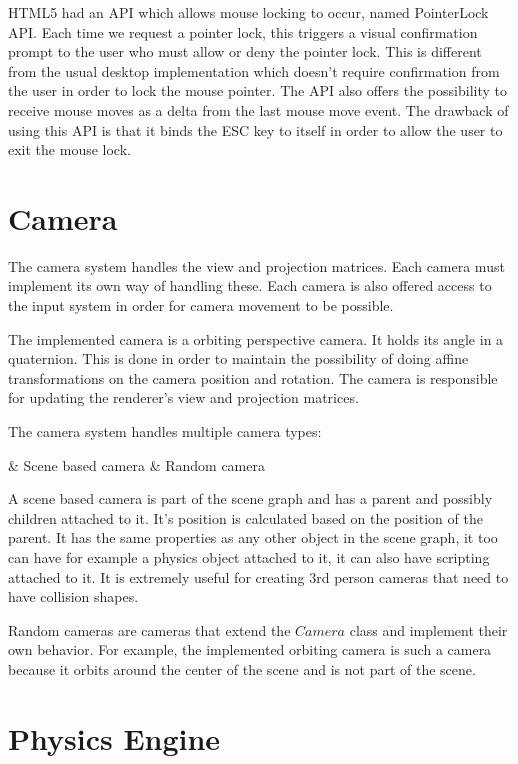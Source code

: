 HTML5 had an API which allows mouse locking to occur, named PointerLock API. Each time we request a pointer lock, this triggers a visual confirmation prompt to the user who must allow or deny the pointer lock. This is different from the usual desktop implementation which doesn't require confirmation from the user in order to lock the mouse pointer.
The API also offers the possibility to receive mouse moves as a delta from the last mouse move event. The drawback of using this API is that it binds the ESC key to itself in order to allow the user to exit the mouse lock. 


\section{Camera}

The camera system handles the view and projection matrices. Each camera must implement its own way of handling these. Each camera is also offered access to the input system in order for camera movement to be possible. 

The implemented camera is a orbiting perspective camera. It holds its angle in a quaternion. This is done in order to maintain the possibility of doing affine transformations on the camera position and rotation. The camera is responsible for updating the renderer’s view and projection matrices.

The camera system handles multiple camera types:
\begin{easylist}
& Scene based camera
& Random camera
\end{easylist}

A scene based camera is part of the scene graph and has a parent and possibly children attached to it. It's position is calculated based on the position of the parent. It has the same properties as any other object in the scene graph, it too can have for example a physics object attached to it, it can also have scripting attached to it. It is extremely useful for creating 3rd person cameras that need to have collision shapes.

Random cameras are cameras that extend the $Camera$ class and implement their own behavior. For example, the implemented orbiting camera is such a camera because it orbits around the center of the scene and is not part of the scene. 

\section{Physics Engine}

